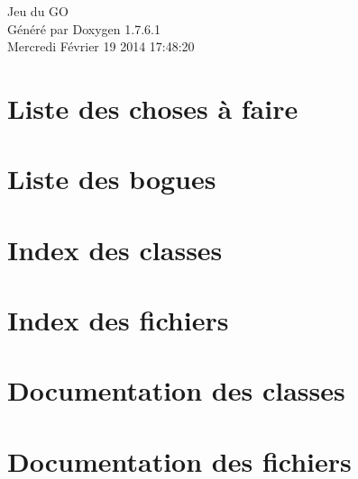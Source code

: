 \documentclass[a4paper]{book}
\begin{document}
\hypersetup{pageanchor=false,citecolor=blue}
\begin{titlepage}
\vspace*{7cm}
\begin{center}
{\Large \-Jeu du \-G\-O }\\
\vspace*{1cm}
{\large \-Généré par Doxygen 1.7.6.1}\\
\vspace*{0.5cm}
{\small Mercredi Février 19 2014 17:48:20}\\
\end{center}
\end{titlepage}
\clearemptydoublepage
{}
\tableofcontents
\clearemptydoublepage
{}
\hypersetup{pageanchor=true,citecolor=blue}
\chapter{\-Liste des choses à faire}
\label{todo}
\hypertarget{todo}{}

\chapter{\-Liste des bogues}
\label{bug}
\hypertarget{bug}{}

\chapter{\-Index des classes}

\chapter{\-Index des fichiers}

\chapter{\-Documentation des classes}







\chapter{\-Documentation des fichiers}





































\printindex
\end{document}
